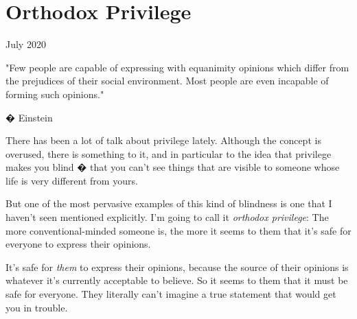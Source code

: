 \chapter{Orthodox Privilege}


            
              
                

July 2020


                  
                    
                      
                        
                          
                            
                              
                                "Few people are capable of expressing with
                                equanimity opinions which differ from the
                                prejudices of their social environment. Most
                                people are even incapable of forming such
                                opinions."

� Einstein
                              
                            
                          
                        
                      
                    
                  
                  


                  There has been a lot of talk about privilege lately. Although
                  the concept is overused, there is something to it, and in
                  particular to the idea that privilege makes you blind � that
                  you can't see things that are visible to someone whose life is
                  very different from yours.

But one of the most
                  pervasive examples of this kind of blindness is one that I
                  haven't seen mentioned explicitly. I'm going to call it
                  \emph{orthodox privilege}: The more conventional-minded
                  someone is, the more it seems to them that it's safe for
                  everyone to express their opinions.

It's safe for
                  \emph{them} to express their opinions, because the source of
                  their opinions is whatever it's currently acceptable to
                  believe. So it seems to them that it must be safe for
                  everyone. They literally can't imagine a true statement that
                  would get you in trouble.

